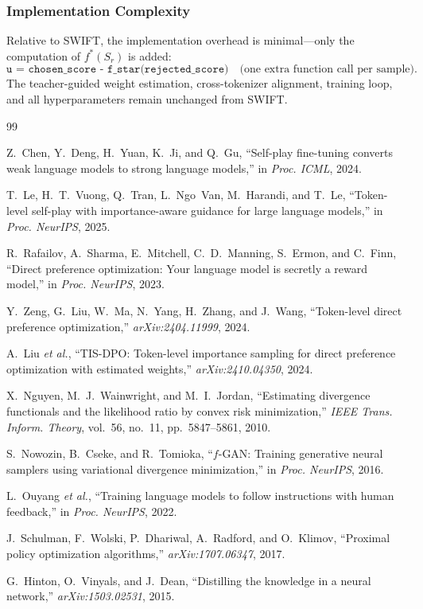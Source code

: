 \documentclass[11pt,a4paper]{article}
\begin{document}
\subsubsection{Implementation Complexity}

Relative to SWIFT, the implementation overhead is minimal---only the computation of $f^*(S_r)$ is added:
\begin{equation}
    \texttt{u = chosen\_score - f\_star(rejected\_score)} \quad \text{(one extra function call per sample)}.
\end{equation}
The teacher-guided weight estimation, cross-tokenizer alignment, training loop, and all hyperparameters remain unchanged from SWIFT.

\begin{thebibliography}{99}

Z.~Chen, Y.~Deng, H.~Yuan, K.~Ji, and Q.~Gu, ``Self-play fine-tuning converts weak language models to strong language models,'' in \textit{Proc. ICML}, 2024.

T.~Le, H.~T.~Vuong, Q.~Tran, L.~Ngo~Van, M.~Harandi, and T.~Le, ``Token-level self-play with importance-aware guidance for large language models,'' in \textit{Proc. NeurIPS}, 2025.

R.~Rafailov, A.~Sharma, E.~Mitchell, C.~D.~Manning, S.~Ermon, and C.~Finn, ``Direct preference optimization: Your language model is secretly a reward model,'' in \textit{Proc. NeurIPS}, 2023.

Y.~Zeng, G.~Liu, W.~Ma, N.~Yang, H.~Zhang, and J.~Wang, ``Token-level direct preference optimization,'' \textit{arXiv:2404.11999}, 2024.

A.~Liu \textit{et al.}, ``TIS-DPO: Token-level importance sampling for direct preference optimization with estimated weights,'' \textit{arXiv:2410.04350}, 2024.

X.~Nguyen, M.~J.~Wainwright, and M.~I.~Jordan, ``Estimating divergence functionals and the likelihood ratio by convex risk minimization,'' \textit{IEEE Trans. Inform. Theory}, vol.~56, no.~11, pp.~5847--5861, 2010.

S.~Nowozin, B.~Cseke, and R.~Tomioka, ``$f$-GAN: Training generative neural samplers using variational divergence minimization,'' in \textit{Proc. NeurIPS}, 2016.

L.~Ouyang \textit{et al.}, ``Training language models to follow instructions with human feedback,'' in \textit{Proc. NeurIPS}, 2022.

J.~Schulman, F.~Wolski, P.~Dhariwal, A.~Radford, and O.~Klimov, ``Proximal policy optimization algorithms,'' \textit{arXiv:1707.06347}, 2017.

G.~Hinton, O.~Vinyals, and J.~Dean, ``Distilling the knowledge in a neural network,'' \textit{arXiv:1503.02531}, 2015.

\end{thebibliography}
\end{document}
